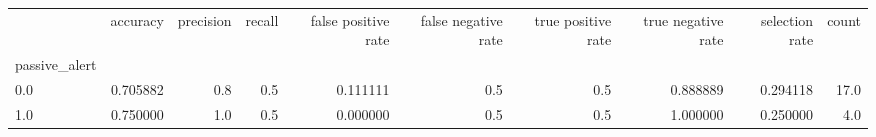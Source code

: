 \begin{tabular}{lrrrrrrrrr}
\toprule
{} &  accuracy &  precision &  recall &  false positive rate &  false negative rate &  true positive rate &  true negative rate &  selection rate &  count \\
passive\_alert &           &            &         &                      &                      &                     &                     &                 &        \\
\midrule
0.0           &  0.705882 &        0.8 &     0.5 &             0.111111 &                  0.5 &                 0.5 &            0.888889 &        0.294118 &   17.0 \\
1.0           &  0.750000 &        1.0 &     0.5 &             0.000000 &                  0.5 &                 0.5 &            1.000000 &        0.250000 &    4.0 \\
\bottomrule
\end{tabular}
